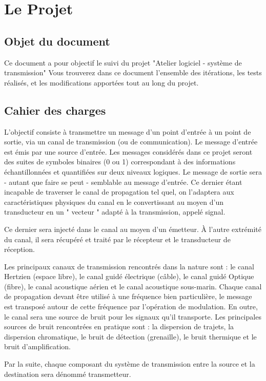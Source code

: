 \section{Le Projet}
\subsection{Objet du document}

Ce document a pour objectif le suivi du projet "Atelier logiciel - système de transmission"
Vous trouverez dans ce document l'ensemble des itérations, les tests réalisés, et les modifications apportées tout au long du projet.

\subsection{Cahier des charges}

L'objectif consiste à transmettre un message d'un point d'entrée à un point de sortie, via un canal de transmission (ou de communication). Le message d'entrée est émis par une source d'entrée. Les messages considérés dans ce projet seront des suites de symboles binaires (0 ou 1) correspondant à des informations échantillonnées et quantifiées sur deux niveaux logiques. Le message de sortie sera - autant que faire se peut - semblable au message d'entrée. Ce dernier étant incapable de traverser le canal de propagation tel quel, on l'adaptera aux caractéristiques physiques du canal en le convertissant au moyen d'un transducteur en un " vecteur " adapté à la transmission, appelé signal.

Ce dernier sera injecté dans le canal au moyen d'un émetteur. À l'autre extrémité du canal, il sera récupéré et traité par le récepteur et le transducteur de réception.

Les principaux canaux de transmission rencontrés dans la nature sont : le canal Hertzien (espace libre), le canal guidé électrique (câble), le canal guidé Optique (fibre), le canal acoustique aérien et le canal acoustique sous-marin. Chaque canal de propagation devant être utilisé à une fréquence bien particulière, le message est transposé autour de cette fréquence par l'opération de modulation. En outre, le canal sera une source de bruit pour les signaux qu'il transporte. Les principales sources de bruit rencontrées en pratique sont : la dispersion de trajets, la dispersion chromatique, le bruit de détection (grenaille), le bruit thermique et le bruit d'amplification.

Par la suite, chaque composant du système de transmission entre la source et la destination sera dénommé transmetteur.

